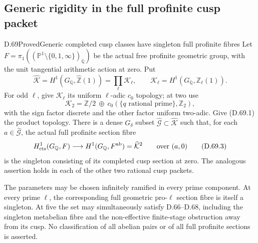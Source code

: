 \subsection{Generic rigidity in the full profinite cusp packet}

\begin{statement}{D.69}{Proved}{Generic completed cusp classes have singleton full profinite fibres}
Let \(F=\pi_1((\mathbb P^1\setminus\{0,1,\infty\})_{\overline{\mathbb Q}})\)
be the actual free profinite geometric group, with the
unit tangential arithmetic action at zero. Put
\[
 \widehat{\mathcal K}=H^1(G_{\mathbb Q},\widehat{\mathbb Z}(1))
          =\prod_\ell\mathcal K_\ell,
 \qquad \mathcal K_\ell=H^1(G_{\mathbb Q},\mathbb Z_\ell(1)).
                                                        \tag{D.69.1}
\]
For odd \(\ell\), give \(\mathcal K_\ell\) its
uniform \(\ell\)-adic \(c_0\) topology; at two use
\[
 \mathcal K_2=\mathbb Z/2\ \oplus\
                   c_0(\{q\text{ rational prime}\},\mathbb Z_2),
                                                        \tag{D.69.2}
\]
with the sign factor discrete and the other factor
uniform two-adic. Give (D.69.1) the product topology.
There is a dense \(G_\delta\) subset
\(\widehat{\mathcal G}\subset\widehat{\mathcal K}\)
such that, for each \(a\in\widehat{\mathcal G}\),
the actual full profinite section fibre
\[
 H^1_{\rm cts}(G_{\mathbb Q},F)
       \longrightarrow H^1(G_{\mathbb Q},F^{\rm ab})
                      =\widehat{\mathcal K}^{2}
       \qquad\text{over }(a,0)
                                                        \tag{D.69.3}
\]
is the singleton consisting of its completed cusp
section at zero. The analogous assertion holds in
each of the other two rational cusp packets.

The parameters may be chosen infinitely ramified
in every prime component. At every prime \(\ell\),
the corresponding full geometric pro-\(\ell\)
section fibre is itself a singleton. At five the
set may simultaneously satisfy D.66--D.68, including
the singleton metabelian fibre and the non-effective
finite-stage obstruction away from its cusp.
No classification of all abelian pairs or of all
full profinite sections is asserted.
\end{statement}

